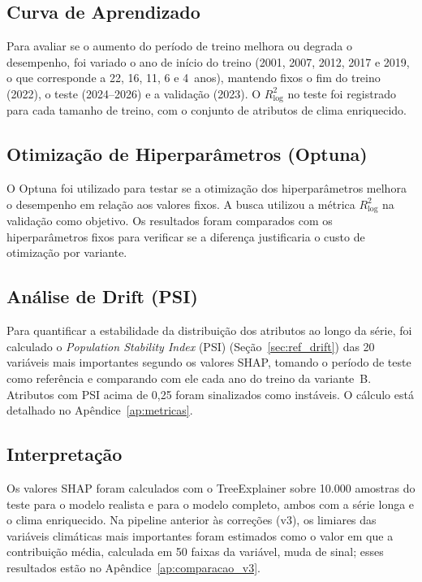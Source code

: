 \subsection{Curva de Aprendizado}
\label{sec:met_learning_curve}

Para avaliar se o aumento do período de treino melhora ou degrada o desempenho, foi variado o ano de início do treino (2001, 2007, 2012, 2017 e 2019, o que corresponde a 22, 16, 11, 6 e 4~anos), mantendo fixos o fim do treino (2022), o teste (2024--2026) e a validação (2023). O $R^2_{\log}$ no teste foi registrado para cada tamanho de treino, com o conjunto de atributos de clima enriquecido.

\subsection{Otimização de Hiperparâmetros (Optuna)}
\label{sec:met_optuna}

O Optuna \cite{optuna2019} foi utilizado para testar se a otimização dos hiperparâmetros melhora o desempenho em relação aos valores fixos. A busca utilizou a métrica $R^2_{\log}$ na validação como objetivo. Os resultados foram comparados com os hiperparâmetros fixos para verificar se a diferença justificaria o custo de otimização por variante.

\subsection{Análise de Drift (PSI)}
\label{sec:met_drift}

Para quantificar a estabilidade da distribuição dos atributos ao longo da série, foi calculado o \textit{Population Stability Index} (PSI) (Seção~\ref{sec:ref_drift}) das 20 variáveis mais importantes segundo os valores SHAP, tomando o período de teste como referência e comparando com ele cada ano do treino da variante~B. Atributos com PSI acima de 0,25 foram sinalizados como instáveis. O cálculo está detalhado no Apêndice~\ref{ap:metricas}.

\subsection{Interpretação}

Os valores SHAP foram calculados com o TreeExplainer sobre 10.000 amostras do teste para o modelo realista e para o modelo completo, ambos com a série longa e o clima enriquecido. Na pipeline anterior às correções (v3), os limiares das variáveis climáticas mais importantes foram estimados como o valor em que a contribuição média, calculada em 50 faixas da variável, muda de sinal; esses resultados estão no Apêndice~\ref{ap:comparacao_v3}.

